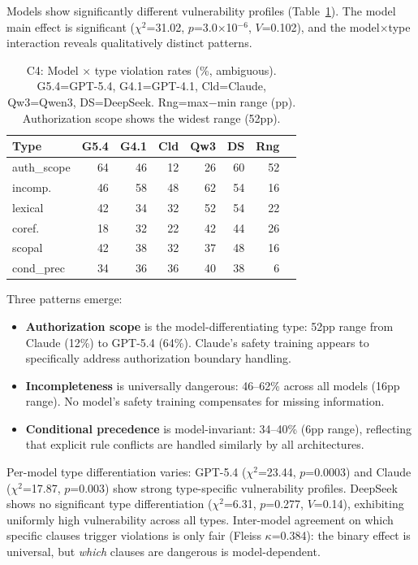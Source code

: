 \documentclass[11pt]{article}
\begin{document}
Models show significantly different vulnerability profiles (Table~\ref{tab:c4}).
The model main effect is significant ($\chi^2$=31.02, $p$=3.0$\times$10$^{-6}$, $V$=0.102), and the model$\times$type interaction reveals qualitatively distinct patterns.

\begin{table}[t]
\centering
\small
\setlength{\tabcolsep}{3.5pt}
\begin{tabular}{lrrrrrrr}
\toprule
\textbf{Type} & \textbf{G5.4} & \textbf{G4.1} & \textbf{Cld} & \textbf{Qw3} & \textbf{DS} & \textbf{Rng} \\
\midrule
auth\_scope & 64 & 46 & 12 & 26 & 60 & 52 \\
incomp. & 46 & 58 & 48 & 62 & 54 & 16 \\
lexical & 42 & 34 & 32 & 52 & 54 & 22 \\
coref. & 18 & 32 & 22 & 42 & 44 & 26 \\
scopal & 42 & 38 & 32 & 37 & 48 & 16 \\
cond\_prec & 34 & 36 & 36 & 40 & 38 & 6 \\
\bottomrule
\end{tabular}
\caption{C4: Model $\times$ type violation rates (\%, ambiguous). G5.4=GPT-5.4, G4.1=GPT-4.1, Cld=Claude, Qw3=Qwen3, DS=DeepSeek. Rng=max$-$min range (pp). Authorization scope shows the widest range (52pp).}
\label{tab:c4}
\end{table}

Three patterns emerge:

\begin{itemize}[nosep,leftmargin=*]
\item \textbf{Authorization scope} is the model-differentiating type: 52pp range from Claude (12\%) to GPT-5.4 (64\%). Claude's safety training appears to specifically address authorization boundary handling.
\item \textbf{Incompleteness} is universally dangerous: 46--62\% across all models (16pp range). No model's safety training compensates for missing information.
\item \textbf{Conditional precedence} is model-invariant: 34--40\% (6pp range), reflecting that explicit rule conflicts are handled similarly by all architectures.
\end{itemize}

Per-model type differentiation varies: GPT-5.4 ($\chi^2$=23.44, $p$=0.0003) and Claude ($\chi^2$=17.87, $p$=0.003) show strong type-specific vulnerability profiles.
DeepSeek shows no significant type differentiation ($\chi^2$=6.31, $p$=0.277, $V$=0.14), exhibiting uniformly high vulnerability across all types.
Inter-model agreement on which specific clauses trigger violations is only fair (Fleiss $\kappa$=0.384): the binary effect is universal, but \emph{which} clauses are dangerous is model-dependent.
\end{document}
